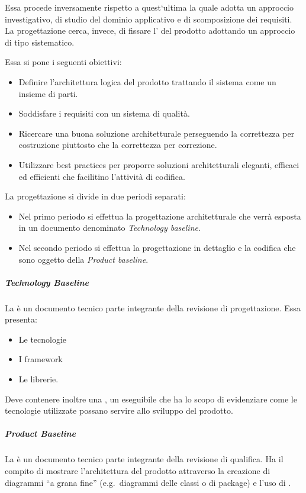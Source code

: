 \documentclass[../../norme-di-progetto.tex]{subfiles}
\begin{document}
Essa procede inversamente rispetto a quest`ultima la quale adotta un approccio investigativo, di studio del dominio applicativo e di scomposizione dei requisiti.
La progettazione cerca, invece, di fissare l' del prodotto adottando un approccio di tipo sistematico.

Essa si pone i seguenti obiettivi:
\begin{itemize}
  \item Definire l'architettura logica del prodotto trattando il sistema come un insieme di parti.
  \item Soddisfare i requisiti con un sistema di qualità.
  \item Ricercare una buona soluzione architetturale perseguendo la correttezza per costruzione piuttosto che la correttezza per correzione.
  \item Utilizzare best practices per proporre soluzioni architetturali eleganti, efficaci ed efficienti che facilitino l'attività di codifica.
\end{itemize}
La progettazione si divide in due periodi separati:
\begin{itemize}
  \item Nel primo periodo si effettua la progettazione architetturale che verrà esposta in un documento denominato \textit{Technology baseline}.
  \item Nel secondo periodo si effettua la progettazione in dettaglio e la codifica che sono oggetto della \textit{Product baseline}.
\end{itemize}

\subparagraph{Technology Baseline}%
\label{subp:technology_baseline}
La  è un documento tecnico parte integrante della revisione di progettazione. Essa presenta:

\begin{itemize}
  \item Le tecnologie
  \item I framework
  \item Le librerie.
\end{itemize}
Deve contenere inoltre una , un eseguibile che ha lo scopo di evidenziare come le tecnologie utilizzate possano servire allo sviluppo del prodotto.

\subparagraph{Product Baseline}%
\label{subp:product_baseline}
La  è un documento tecnico parte integrante della revisione di qualifica.
Ha il compito di mostrare l'architettura del prodotto attraverso la creazione di diagrammi ``a grana fine'' (e.g.\ diagrammi delle classi o di package) e l'uso di .
\end{document}
